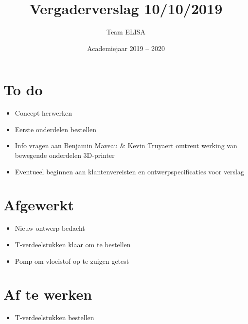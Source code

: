 \documentclass[a4paper,kulak]{kulakarticle} %
\date{Academiejaar 2019 -- 2020}
\title{Vergaderverslag 10/10/2019}
\author{Team ELISA}
\begin{document}
	
	\maketitle
	
	\section*{To do}
	
	\begin{itemize}
		\item Concept herwerken
		\item Eerste onderdelen bestellen
		\item Info vragen aan Benjamin Maveau \& Kevin Truyaert omtrent werking van bewegende onderdelen 3D-printer
		\item Eventueel beginnen aan klantenvereisten en ontwerpspecificaties voor verslag
		
	\end{itemize}
	
	\section*{Afgewerkt}
	\begin{itemize}
		\item Nieuw ontwerp bedacht
		\item T-verdeelstukken klaar om te bestellen
		\item Pomp om vloeistof op te zuigen getest
	\end{itemize}
	
	\section*{Af te werken}
	\begin{itemize}
		\item T-verdeelstukken bestellen
	\end{itemize}
	
\end{document}
